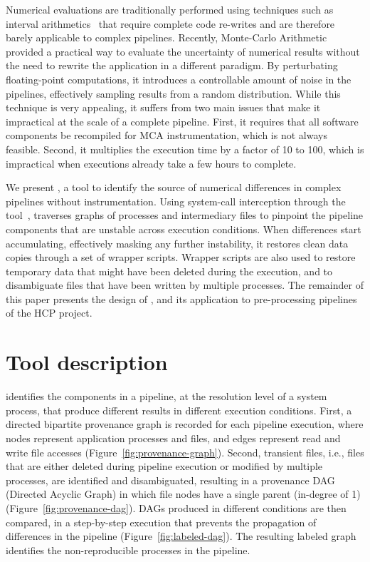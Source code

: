 Numerical evaluations are traditionally performed using techniques such as
interval arithmetics~\cite{hickey2001interval} that require complete code re-writes and are
therefore barely applicable to complex pipelines. Recently, Monte-Carlo
Arithmetic~\cite{Parker1997-qq, denis2015verificarlo} provided a practical way to
evaluate the uncertainty of numerical results without the need to rewrite
the application in a different paradigm. By perturbating floating-point
computations, it introduces a controllable amount of noise in the
pipelines, effectively sampling results from a random distribution. While
this technique is very appealing, it suffers from two main issues that make
it impractical at the scale of a complete pipeline. First, it requires that
all software components be recompiled for MCA instrumentation, which is not
always feasible. Second, it multiplies the execution time by a factor of 10
to 100, which is impractical when executions already take a few hours to
complete.

We present \toolname, a tool to identify the source of numerical differences in
complex pipelines without instrumentation. Using system-call interception
through the \reprozip tool~\cite{rampin2016reprozip}, \toolname traverses graphs of processes and
intermediary files to pinpoint the pipeline components that are unstable
across execution conditions. When differences start accumulating,
effectively masking any further instability, it restores clean data copies
through a set of wrapper scripts. Wrapper scripts are also used to restore
temporary data that might have been deleted during the execution, and to
disambiguate files that have been written by multiple processes. The remainder of this paper
presents the design of \toolname, and its
application to pre-processing pipelines of the HCP project.


\section{Tool description}

\toolname identifies the components in a pipeline, at the resolution level of a system process, that produce different
results in different execution conditions. First, a directed
bipartite provenance graph is recorded for each pipeline execution, where nodes
represent application processes and files, and edges represent read and
write file accesses (Figure~\ref{fig:provenance-graph}). Second,
transient files, i.e., files that are either deleted during pipeline
execution or modified by multiple processes, are identified and
disambiguated, resulting in a provenance DAG (Directed Acyclic
Graph) in which file nodes have a single parent (in-degree of 1) (Figure~\ref{fig:provenance-dag}).
DAGs produced in different conditions are then compared, in
a step-by-step execution that prevents the propagation of differences in the pipeline (Figure~\ref{fig:labeled-dag}).
 The resulting labeled graph identifies the
non-reproducible processes in the pipeline.


